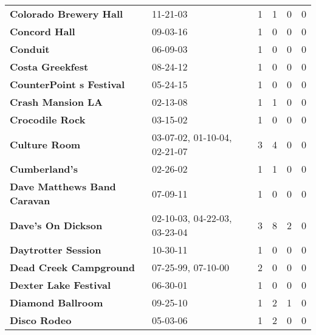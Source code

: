 \begin{supertabular}{llllll}
                                       \textbf{Colorado Brewery Hall} &                      11-21-03 &  1 &   1 &  0 &  0 \\
                                                \textbf{Concord Hall} &                      09-03-16 &  1 &   0 &  0 &  0 \\
                                                     \textbf{Conduit} &                      06-09-03 &  1 &   0 &  0 &  0 \\
                                             \textbf{Costa Greekfest} &                      08-24-12 &  1 &   0 &  0 &  0 \\
                                     \textbf{CounterPoint s Festival} &                      05-24-15 &  1 &   0 &  0 &  0 \\
                                            \textbf{Crash Mansion LA} &                      02-13-08 &  1 &   1 &  0 &  0 \\
                                              \textbf{Crocodile Rock} &                      03-15-02 &  1 &   0 &  0 &  0 \\
                                                \textbf{Culture Room} &  03-07-02, 01-10-04, 02-21-07 &  3 &   4 &  0 &  0 \\
                                                \textbf{Cumberland's} &                      02-26-02 &  1 &   1 &  0 &  0 \\
                                  \textbf{Dave Matthews Band Caravan} &                      07-09-11 &  1 &   0 &  0 &  0 \\
                                           \textbf{Dave's On Dickson} &  02-10-03, 04-22-03, 03-23-04 &  3 &   8 &  2 &  0 \\
                                          \textbf{Daytrotter Session} &                      10-30-11 &  1 &   0 &  0 &  0 \\
                                       \textbf{Dead Creek Campground} &            07-25-99, 07-10-00 &  2 &   0 &  0 &  0 \\
                                        \textbf{Dexter Lake Festival} &                      06-30-01 &  1 &   0 &  0 &  0 \\
                                            \textbf{Diamond Ballroom} &                      09-25-10 &  1 &   2 &  1 &  0 \\
                                                 \textbf{Disco Rodeo} &                      05-03-06 &  1 &   2 &  0 &  0 \\

\end{supertabular}

